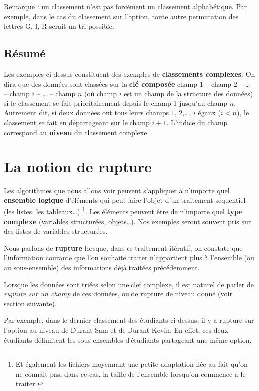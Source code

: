 	Remarque : un classement n’est pas forcément un classement alphabétique.
        Par exemple, dans le cas du classement sur l'option, toute autre
        permutation des lettres G, I, R serait un tri possible.

\subsection*{Résumé}
	Les exemples ci-dessus constituent des exemples de \textbf{classements complexes}. 
	On dira que des données sont classées sur la \textbf{clé composée} 
	champ $1$ – champ $2$ – \dots{} – champ $i$ – \dots{} – champ $n$ 
	(où \og{}champ $i$\fg{} est un champ de la structure des données) 
	si le classement se fait prioritairement depuis le champ $1$ jusqu’au champ $n$. 
	Autrement dit, si deux données ont tous leurs champs $1$, $2$,\dots, $i$ égaux ($i<n$), 
	le classement se fait en départageant sur le champ $i+1$. 
	L’indice du champ correspond au \textbf{niveau} du classement complexe.

\section{La notion de rupture}

	Les algorithmes que nous allons voir 
	peuvent s'appliquer à n'importe quel \textbf{ensemble logique} d'éléments
	qui peut faire l'objet d'un traitement séquentiel
	(les listes, les tableaux\dots)%
	\footnote{%
		Et également les fichiers moyennant une petite adaptation
		liée au fait qu'on ne connait pas, dans ce cas, 
		la taille de l'ensemble lorsqu'on commence à le traiter.
	}. 
	Les éléments peuvent être de n'importe quel \textbf{type complexe} 
	(variables structurées, objets\dots).
	Nos exemples seront souvent pris sur des listes de variables structurées. 
		
	Nous parlons de \textbf{rupture} lorsque, dans ce traitement itératif, 
	on constate que l’information courante que l’on souhaite traiter
	n’appartient plus à l’ensemble (ou au sous-ensemble) 
	des informations déjà traitées précédemment.
	
	Lorsque les données sont triées selon une clef complexe, il est naturel
        de parler de \textit{rupture sur un champ} de ces données, ou de rupture
        de niveau donné (voir section suivante).
	
	Par exemple, dans le dernier classement des étudiants ci-dessus, il y a
	rupture sur l’option au niveau de Durant Sam et de Durant Kevin. En
	effet, ces deux étudiants délimitent les sous-ensembles d’étudiants
	partageant une même option.
	
